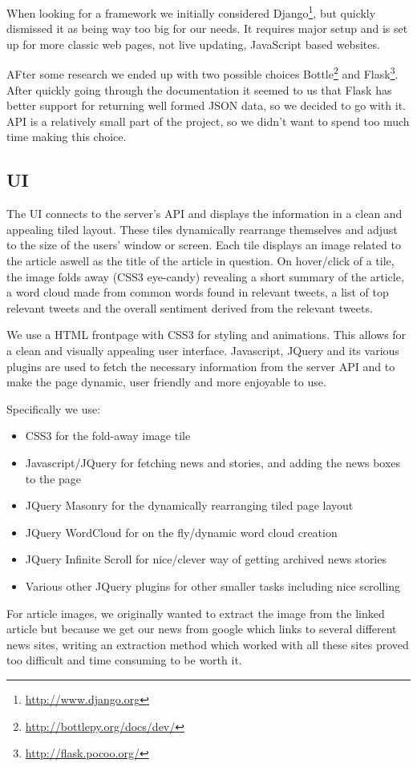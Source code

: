 \documentclass{report}
\begin{document}
		When looking for a framework we initially considered Django\footnote{\url{http://www.django.org}}, but quickly dismissed it as being way too big for our needs. It requires major setup and is set up for more classic web pages, not live updating, JavaScript based websites.
		
		AFter some research we ended up with two possible choices Bottle\footnote{\url{http://bottlepy.org/docs/dev/}} and Flask\footnote{\url{http://flask.pocoo.org/}}. After quickly going through the documentation it seemed to us that Flask has better support for returning well formed JSON data, so we decided to go with it. API is a relatively small part of the project, so we didn't want to spend too much time making this choice.
		
		\subsection{UI}
		The UI connects to the server's API and displays the information in a clean and appealing tiled layout. These tiles dynamically rearrange themselves and adjust to the size of the users' window or screen. Each tile displays an image related to the article aswell as the title of the article in question. On hover/click of a tile, the image folds away (CSS3 eye-candy) revealing a short summary of the article, a word cloud made from common words found in relevant tweets, a list of top relevant tweets and the overall sentiment derived from the relevant tweets.

    We use a HTML frontpage with CSS3 for styling and animations. This allows for a clean and visually appealing user interface. Javascript, JQuery and its various plugins are used to fetch the necessary information from the server API and to make the page dynamic, user friendly and more enjoyable to use.

Specifically we use:
  \begin{itemize}
    \item CSS3 for the fold-away image tile
    \item Javascript/JQuery for fetching news and stories, and adding the news boxes to the page
    \item JQuery Masonry for the dynamically rearranging tiled page layout
    \item JQuery WordCloud for on the fly/dynamic word cloud creation
    \item JQuery Infinite Scroll for nice/clever way of getting archived news stories
    \item Various other JQuery plugins for other smaller tasks including nice scrolling
  \end{itemize}
    For article images, we originally wanted to extract the image from the linked article but because we get our news from google which links to several different news sites, writing an extraction method which worked with all these sites proved too difficult and time consuming to be worth it.
    
\end{document}
